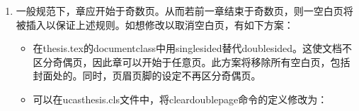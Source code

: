 \begin{enumerate}
        若需设置字体库，请选择xelatex或lualatex编译引擎，并设置需要的字体库。如用Times New Roman作为英文字体，在artratex.sty中设置:

                 \verb|\setmainfont{Times New Roman}|

                 用户如果需要安装并调用一个自定义的中文字体库，方法为：

                \begin{itemize}
                    \item 调用 \href{https://ctan.org/pkg/ctex?lang=en}{ctex} 预定义好的备用字库： 在Thesis.tex中设置

                        {
                            \small
                            \verb|\documentclass[doublesided,fontset=fandol]{Style/ucasthesis}%|
                         }

                         便可方便地调用 \href{https://ctan.org/tex-archive/fonts/fandol?lang=en}{fandol} 这一字体库。\LaTeX{}编译系统一般已携带或是能自动下载安装 \href{https://ctan.org/tex-archive/fonts/fandol?lang=en}{fandol} 字库。若不能，则请手动下载并安装链接所提供的所有字体即可。

                     \item 手动调用系统带有的中文字库： 如调用SC字体，在artratex.sty的

                         \verb|\RequirePackage{fontspec}|

                        行下添加如下中文字体调用命令：
                        {
                            \scriptsize
\begin{verbatim}
\setCJKmainfont[BoldFont=Songti SC Bold,ItalicFont=Kaiti SC]{Songti SC Light}%
\setCJKsansfont{Heiti SC}%
\end{verbatim}
                        }
                \end{itemize}

                字库调用的全面解释可参见 \href{https://ctan.org/pkg/fontspec}{fontspec} （英文字体调用）和 \href{https://ctan.org/pkg/xecjk?lang=en}{xeCJK} （中文字体调用）。

                因为模版的设定考虑兼顾不同操作系统（Windows, Linux, Mac OS），为了模版的健壮性，上述字体设置和调用方案并未作为原始设定。
    \item  一般规范下，章应开始于奇数页。从而若前一章结束于奇数页，则一空白页将被插入以保证上述规则。如想修改以取消空白页，有如下方案：
     \begin{itemize}
         \item 在thesis.tex的documentclass中用singlesided替代doublesided。这使文档不区分奇偶页，因此章可以开始于任意页。此方案将移除所有空白页，包括封面处的。同时，页眉页脚的设定不再区分奇偶页。
         \item 可以在ucasthesis.cls文件中，将cleardoublepage命令的定义修改为：


\end{itemize}
\end{enumerate}
